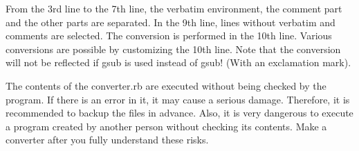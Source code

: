 From the 3rd line to the 7th line, the verbatim environment, the comment
part and the other parts are separated. In the 9th line, lines without
verbatim and comments are selected. The conversion is performed in the
10th line. Various conversions are possible by customizing the 10th
line. Note that the conversion will not be reflected if gsub is used
instead of gsub! (With an exclamation mark).

The contents of the converter.rb are executed without being checked by
the program. If there is an error in it, it may cause a serious damage.
Therefore, it is recommended to backup the files in advance. Also, it is
very dangerous to execute a program created by another person without
checking its contents. Make a converter after you fully understand these
risks.
